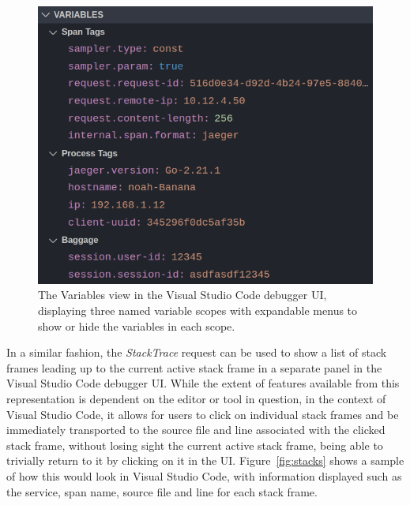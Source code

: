 \documentclass[12pt,pdftex,titlepage]{report}
\begin{document}
                \bigskip
                \begin{figure}[htb!]
                    \centering
                    \includegraphics[scale=1.7]{scopes.png}
                    \caption{The Variables view in the Visual Studio Code debugger UI, displaying three named variable scopes with expandable menus to show or hide the variables
                    in each scope.}
                    \label{fig:scopes}
                \end{figure}

                In a similar fashion, the \textit{StackTrace} request can be used to show a list of stack frames leading up to the current active stack frame in a separate panel in the Visual Studio Code debugger UI. While the extent of 
                features available from this representation is dependent on the editor or tool in question, in the context of Visual Studio Code, it allows for users to click on individual stack frames and be immediately transported 
                to the source file and line associated with the clicked stack frame, without losing sight the current active stack frame, being able to trivially return to it by clicking on it in the UI. Figure~\ref{fig:stacks} shows a 
                sample of how this would look in Visual Studio Code, with information displayed such as the service, span name, source file and line for each stack frame.
\end{document}
